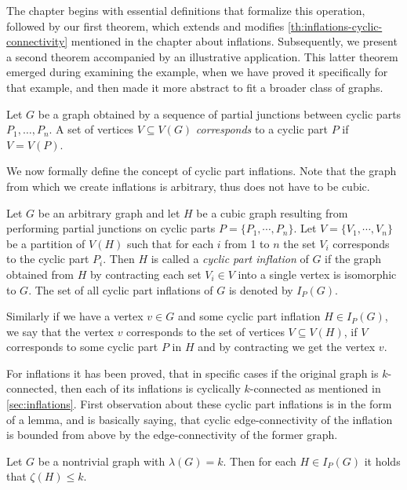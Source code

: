 \documentclass[12pt, twoside]{book}
\begin{document}
The chapter begins with essential definitions that formalize this operation, followed by our first theorem, which extends and modifies \cref{th:inflations-cyclic-connectivity} mentioned in the chapter about inflations. Subsequently, we present a second theorem accompanied by an illustrative application. This latter theorem emerged during examining the example, when we have proved it specifically for that example, and then made it more abstract to fit a broader class of graphs.

Let $G$ be a graph obtained by a sequence of partial junctions between cyclic parts $P_1,\dots,P_n$. A set of vertices $V\subseteq V(G)$ \textit{corresponds} to a cyclic part $P$ if $V=V(P)$.

We now formally define the concept of cyclic part inflations. Note that the graph from which we create inflations is arbitrary, thus does not have to be cubic.

\begin{definition}
	\label{def:cyclic-part-inflation}
	Let $G$ be an arbitrary graph and let $H$ be a cubic graph resulting from performing partial junctions on cyclic parts $P=\{P_1,\cdots,P_n\}$. Let $V=\{V_1,\cdots, V_n\}$ be a partition of $V(H)$ such that for each $i$ from 1 to $n$ the set $V_i$ corresponds to the cyclic part $P_i$. Then $H$ is called a \textit{cyclic part inflation} of $G$ if the graph obtained from $H$ by contracting each set $V_i\in V$ into a single vertex is isomorphic to $G$. The set of all cyclic part inflations of $G$ is denoted by $I_P(G)$.
\end{definition}

Similarly if we have a vertex $v\in G$ and some cyclic part inflation $H\in I_P(G)$, we say that the vertex $v$ corresponds to the set of vertices $V\subseteq V(H)$, if $V$ corresponds to some cyclic part $P$ in $H$ and by contracting we get the vertex $v$.

For inflations it has been proved, that in specific cases if the original graph is $k$-connected, then each of its inflations is cyclically $k$-connected as mentioned in \cref{sec:inflations}. First observation about these cyclic part inflations is in the form of a lemma, and is basically saying, that cyclic edge-connectivity of the inflation is bounded from above by the edge-connectivity of the former graph.

\begin{lemma}
	Let $G$ be a nontrivial graph with $\lambda(G)=k$. Then for each $H\in I_P(G)$ it holds that $\zeta(H)\leq k$.
\end{lemma}
\end{document}
